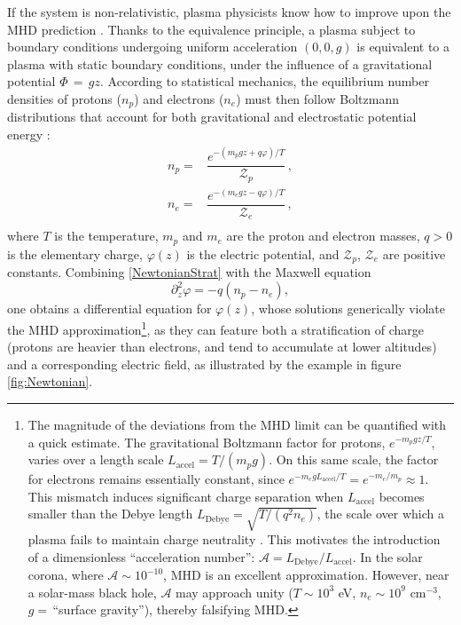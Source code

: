 \documentclass[a4paper, amsfonts, amssymb, amsmath, reprint, showkeys, nofootinbib, twoside, onecolumn,notitlepage]{revtex4-1}
\theoremstyle{definition}
\theoremstyle{theorem}
\begin{document}
If the system is non-relativistic, plasma physicists know how to improve upon the MHD prediction \cite[\S 1.6]{bellan_2006}. Thanks to the equivalence principle, a plasma subject to boundary conditions undergoing uniform acceleration $(0,0,g)$ is equivalent to a plasma with static boundary conditions, under the influence of a gravitational potential $\Phi \,{=}\, gz$. According to statistical mechanics, the equilibrium number densities of protons ($n_p$) and electrons ($n_e$) must then follow Boltzmann distributions that account for both gravitational and electrostatic potential energy \cite[\S 4.2]{huang_book}:
\begin{equation}\label{NewtonianStrat}
\begin{split}
n_p={}& \dfrac{e^{-(m_p gz+ q \varphi)/T}}{\mathcal{Z}_p} \, , \\
n_e={}& \dfrac{e^{-(m_e gz -q \varphi)/T}}{\mathcal{Z}_e} \, ,\\
\end{split} 
\end{equation}
where $T$ is the temperature, $m_p$ and $m_e$ are the proton and electron masses, $q>0$ is the elementary charge, $\varphi(z)$ is the electric potential, and $\mathcal{Z}_p$, $\mathcal{Z}_e$ are positive constants. Combining \eqref{NewtonianStrat} with the Maxwell equation
\begin{equation}\label{Coulomblaw}
\partial_z^2 \varphi = -q (n_p {-} n_e) ,
\end{equation}
one obtains a differential equation for $\varphi(z)$, whose solutions generically violate the MHD approximation\footnote{\label{footononon1}The magnitude of the deviations from the MHD limit can be quantified with a quick estimate. The gravitational Boltzmann factor for protons, $e^{-m_pgz/T}$, varies over a length scale 
$L_\text{accel}=T/(m_p g)$. On this same scale, the factor for electrons remains essentially constant, since $e^{-m_egL_\text{accel}/T}=e^{-m_e/m_p}\approx 1$. This mismatch induces significant charge separation when $L_\text{accel}$ becomes smaller than the Debye length $L_\text{Debye}=\sqrt{T/(q^2n_e)}$, the scale over which a plasma fails to maintain charge neutrality \cite[§1.6]{bellan_2006}. This motivates the introduction of a dimensionless ``acceleration number'': $
\mathscr{A} = L_\text{Debye}/L_\text{accel}$. In the solar corona, where $\mathscr{A}\sim 10^{-10}$, MHD is an excellent approximation. However, near a solar-mass black hole, $\mathscr{A}$ may approach unity ($T\sim 10^3$ eV, $n_e\sim 10^9$ cm$^{-3}$, $g=\,$``surface gravity''), thereby falsifying MHD.}, as they can feature both a stratification of charge (protons are heavier than electrons, and tend to accumulate at lower altitudes) and a corresponding electric field, as illustrated by the example in figure \ref{fig:Newtonian}.
\end{document}
